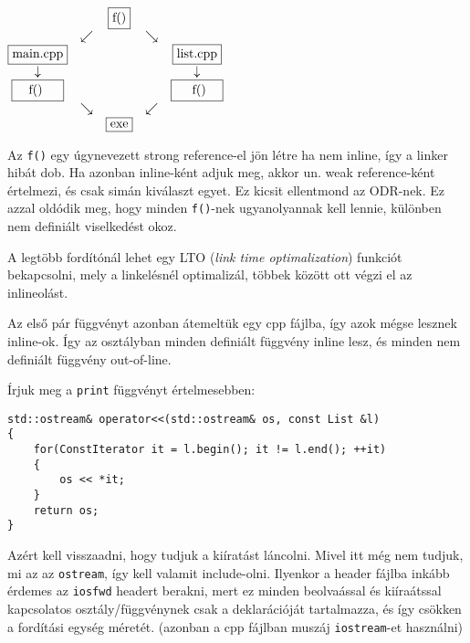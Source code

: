 \documentclass[a4paper,11.5pt]{article}
\begin{document}
	\begin{center}
		$\begin{matrix}
		&&\fbox{f()}&&\\
		&\swarrow&&\searrow&\\
		\fbox{\text{main.cpp}}&&&&\fbox{list.cpp}\\
		\downarrow&&&&\downarrow\\
		\fbox{\quad   f() \quad }&&&&\fbox{ \quad f()\quad  }\\
		&\searrow&&\swarrow&\\
		&&\fbox{exe}&&
		\end{matrix}$
	\end{center}
	Az \texttt{f()} egy úgynevezett strong reference-el jön létre ha nem inline, így a linker hibát dob. Ha azonban inline-ként adjuk meg, akkor un. weak reference-ként értelmezi, és csak simán kiválaszt egyet. Ez kicsit ellentmond az ODR-nek. Ez azzal oldódik meg, hogy minden \texttt{f()}-nek ugyanolyannak kell lennie, különben nem definiált viselkedést okoz.
	\begin{note}
		A legtöbb fordítónál lehet egy LTO (\textit{link time optimalization}) funkciót bekapcsolni, mely a linkelésnél optimalizál, többek között ott végzi el az inlineolást.
	\end{note}
	Az első pár függvényt azonban átemeltük egy cpp fájlba, így azok mégse lesznek inline-ok. Így az osztályban minden definiált függvény inline lesz, és minden nem definiált függvény out-of-line.
	
	\medskip
	Írjuk meg a \texttt{print} függvényt értelmesebben:
	\begin{lstlisting}
std::ostream& operator<<(std::ostream& os, const List &l)
{
	for(ConstIterator it = l.begin(); it != l.end(); ++it)
	{
		os << *it;
	}
	return os;
}
	\end{lstlisting}
	Azért kell visszaadni, hogy tudjuk a kiíratást láncolni. Mivel itt még nem tudjuk, mi az az \texttt{ostream}, így kell valamit include-olni. Ilyenkor a header fájlba inkább érdemes az \texttt{iosfwd} headert berakni, mert ez minden beolvaással és kiíraátssal kapcsolatos osztály/függvénynek csak a deklarációját tartalmazza, és így csökken a fordítási egység méretét. (azonban a cpp fájlban muszáj \texttt{iostream}-et használni)
	
\end{document}
